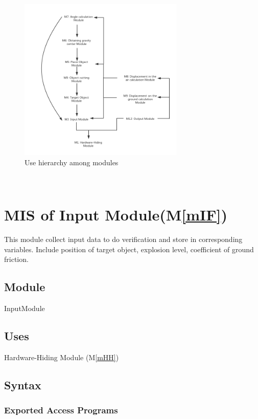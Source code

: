 \documentclass[12pt, titlepage]{article}
\newcommand{\mref}[1]{M\ref{#1}}
\begin{document}
\begin{figure}[H]
	\centering
	\includegraphics[width=0.7\textwidth]{./Figure1.png}
	\caption{Use hierarchy among modules}
	\label{FigUH}
\end{figure}

~\newpage

\section{MIS of Input Module(\mref{mIF})} 

This module collect input data to do verification and store in corresponding variables. Include position of target object, explosion level, coefficient of ground friction.

\subsection{Module}

InputModule

\subsection{Uses}

Hardware-Hiding Module (\mref{mHH})

\subsection{Syntax}



\subsubsection{Exported Access Programs}
\end{document}

